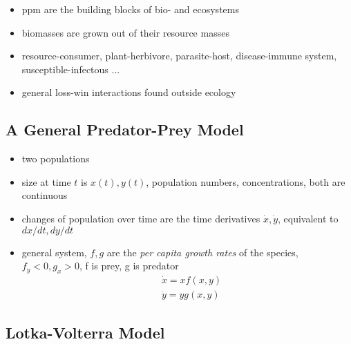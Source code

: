 \documentclass[a4paper,reqno,11pt]{article}
\begin{document}
\begin{itemize}
    \item ppm are the building blocks of bio- and ecosystems
    \item biomasses are grown out of their resource masses
    \item resource-consumer, plant-herbivore, parasite-host, disease-immune
        system, susceptible-infectous ...
    \item general loss-win interactions found outside ecology
\end{itemize}

\subsection{A General Predator-Prey Model}

\begin{itemize}
    \item two populations
    \item size at time $t$ is $x(t), y(t)$, population numbers, concentrations,
        both are continuous
    \item changes of population over time are the time derivatives $\dot x,
        \dot y$, equivalent to $dx/dt, dy/dt$
    \item general system, $f,g$ are the \textit{per capita growth rates} of the
        species, $f_y < 0, g_x > 0$, f is prey, g is predator
        \begin{align}\nonumber
            &\dot x = x f(x,y) \\ \nonumber
            &\dot y = y g(x,y)
        \end{align}
\end{itemize}

\subsection{Lotka-Volterra Model}
\end{document}
